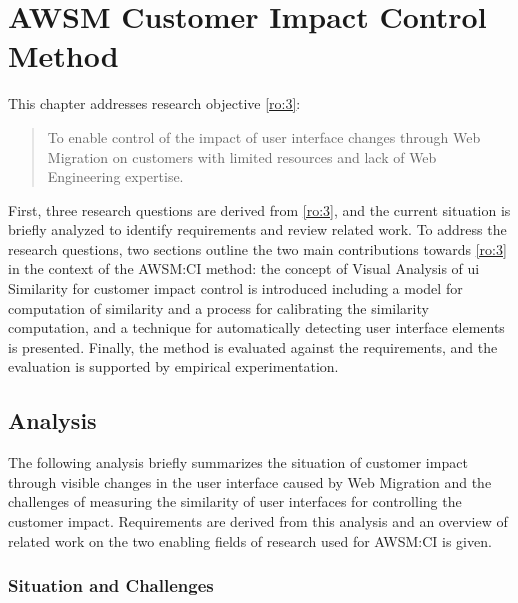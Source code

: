 \hypertarget{sec:awsm-ci}{%
\chapter{AWSM Customer Impact Control Method}\label{sec:awsm-ci}}

This chapter addresses research objective \cref{ro:3}:

\vspace{-5pt}
\begin{quote}
To enable control of the impact of user interface changes through \gls{Web Migration} on customers with limited resources and lack of \gls{Web Engineering} expertise.
\end{quote}
\vspace{-5pt}
First, three research questions are derived from \cref{ro:3}, and the current situation is briefly analyzed to identify requirements and review related work.
To address the research questions, two sections outline the two main contributions towards \cref{ro:3} in the context of the AWSM:CI method: the concept of Visual Analysis of \gls{ui} Similarity for customer impact control is introduced including a model for computation of similarity and a process for calibrating the similarity computation, and a technique for automatically detecting user interface elements is presented.
Finally, the method is evaluated against the requirements, and the evaluation is supported by empirical experimentation.

\vspace{-30pt}
\hypertarget{sec:ci.analysis}{%
\section{Analysis}\label{sec:ci.analysis}}
\vspace{5pt}

The following analysis briefly summarizes the situation of customer impact through visible changes in the user interface caused by \gls{Web Migration} and the challenges of measuring the similarity of user interfaces for controlling the customer impact.
Requirements are derived from this analysis and an overview of related work on the two enabling fields of research used for AWSM:CI is given.

\subsection{Situation and Challenges}
\vspace{10pt}

